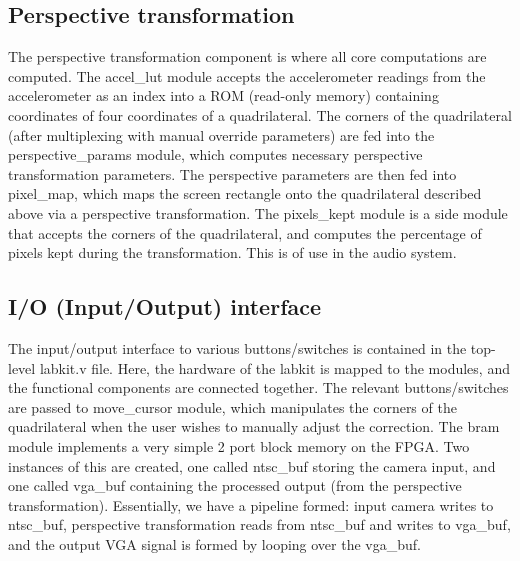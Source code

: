\documentclass{article}
\begin{document}
\subsection{Perspective transformation}
The perspective transformation component is where all core computations are computed.
The accel\_lut module accepts the accelerometer readings from the accelerometer as an index into a ROM (read-only memory) containing coordinates of four coordinates of a quadrilateral.
The corners of the quadrilateral (after multiplexing with manual override parameters) are fed into the perspective\_params module, which computes necessary perspective transformation parameters.
The perspective parameters are then fed into pixel\_map, which maps the screen rectangle onto the quadrilateral described above via a perspective transformation.
The pixels\_kept module is a side module that accepts the corners of the quadrilateral, and computes the percentage of pixels kept during the transformation.
This is of use in the audio system.

\subsection{I/O (Input/Output) interface}
The input/output interface to various buttons/switches is contained in the top-level labkit.v file.
Here, the hardware of the labkit is mapped to the modules, and the functional components are connected together.
The relevant buttons/switches are passed to move\_cursor module, which manipulates the corners of the quadrilateral when the user wishes to manually adjust the correction.
The bram module implements a very simple 2 port block memory on the FPGA.
Two instances of this are created, one called ntsc\_buf storing the camera input, and one called vga\_buf containing the processed output (from the perspective transformation).
Essentially, we have a pipeline formed:
input camera writes to ntsc\_buf, perspective transformation reads from ntsc\_buf and writes to vga\_buf, and the output VGA signal is formed by looping over the vga\_buf.
\end{document}
